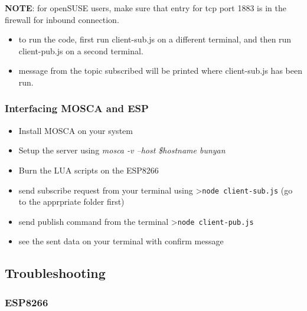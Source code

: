 \documentclass[16pt]{article}
\begin{document}
 

\vspace{0.3cm}

\textbf{NOTE}: for openSUSE users, make sure that entry for tcp port
1883 is in the firewall for inbound connection.

\begin{itemize}

\item
  to run the code, first run client-sub.js on a different terminal, and
  then run client-pub.js on a second terminal.
\item
  message from the topic subscribed will be printed where client-sub.js
  has been run.
\end{itemize}



\vspace{0.5cm}

\subsubsection{Interfacing MOSCA and ESP}

\begin{itemize}

\item
  Install MOSCA on your system
\item
  Setup the server using \emph{mosca -v --host \$hostname \textbar{}
  bunyan}
\item
  Burn the LUA scripts on the ESP8266
\item


  send subscribe request from your terminal using
  \textgreater{}\texttt{node client-sub.js} (go to the apprpriate folder
  first)
\item
  send publish command from the terminal
  \textgreater{}\texttt{node client-pub.js}
\item
  see the sent data on your terminal with confirm message
\end{itemize}



\subsection{Troubleshooting}


\subsubsection{ESP8266}
\end{document}
